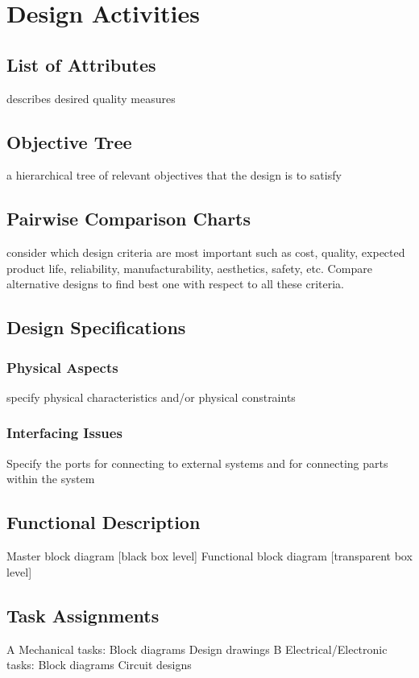 \chapter{Design Activities}
\section{List of Attributes}
describes desired quality measures
\section{Objective Tree}
a hierarchical tree of relevant objectives that the design is to satisfy
\section{Pairwise Comparison Charts}
consider which design criteria are most important such as cost,
quality, expected product life, reliability, manufacturability, aesthetics, safety, etc. Compare alternative designs to find best one with respect to all these criteria.
\section{Design Specifications}
	\subsection{Physical Aspects}
		specify physical characteristics and/or physical constraints
	\subsection{Interfacing Issues}
		Specify the ports for connecting to external systems and for connecting
		parts within the system
\section{Functional Description}
Master block diagram [black box level]
Functional block diagram [transparent box level]
\section{Task Assignments}
A Mechanical tasks: Block diagrams
Design drawings
B Electrical/Electronic tasks: Block diagrams
Circuit designs
